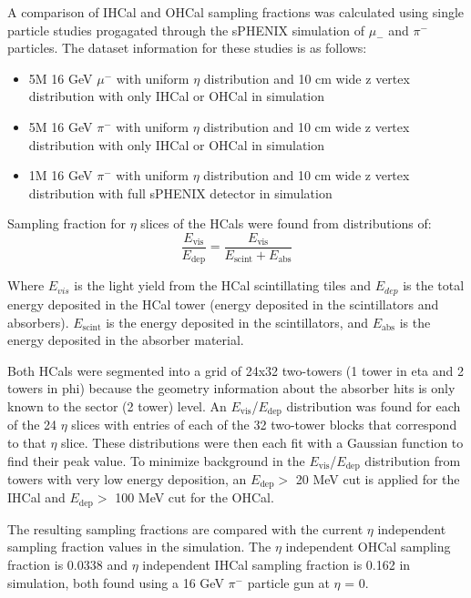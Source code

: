 A comparison of IHCal and OHCal sampling fractions was calculated using single particle studies progagated through the sPHENIX \geant simulation of $\mu_{-}$ and $\pi^{-}$ particles. 
The dataset information for these studies is as follows: 
\begin{itemize}
    \item 5M 16 GeV $\mu^{-}$ with uniform $\eta$ distribution and 10 cm wide z vertex distribution with only IHCal or OHCal in simulation
    \item 5M 16 GeV $\pi^{-}$ with uniform $\eta$ distribution and 10 cm wide z vertex distribution with only IHCal or OHCal in simulation
    \item 1M 16 GeV $\pi^{-}$ with uniform $\eta$ distribution and 10 cm wide z vertex distribution with full sPHENIX detector in simulation
\end{itemize}

Sampling fraction for $\eta$ slices of the HCals were found from distributions of:
\begin{equation}
    \frac{E_{\text{vis}}}{E_{\text{dep}}} = \frac{E_{\text{vis}}}{E_{\text{scint}} + E_{\text{abs}}}
\end{equation}

Where $E_{vis}$ is the light yield from the HCal scintillating tiles and $E_{dep}$ is the total energy deposited in the HCal tower (energy deposited in the scintillators and absorbers). 
$E_{\text{scint}}$ is the energy deposited in the scintillators, and $E_{\text{abs}}$ is the energy deposited in the absorber material.

Both HCals were segmented into a grid of 24x32 two-towers (1 tower in eta and 2 towers in phi) because the geometry information about the absorber hits is only known to the sector (2 tower) level. 
An $E_{\text{vis}}$/$E_{\text{dep}}$ distribution was found for each of the 24 $\eta$ slices with entries of each of the 32 two-tower blocks that correspond to that $\eta$ slice. 
These distributions were then each fit with a Gaussian function to find their peak value.
To minimize background in the $E_{\text{vis}}$/$E_{\text{dep}}$ distribution from towers with very low energy deposition, an $E_{\text{dep}} >$ 20 MeV cut is applied for the IHCal and $E_{\text{dep}} >$ 100 MeV cut for the OHCal.

The resulting sampling fractions are compared with the current $\eta$ independent sampling fraction values in the simulation. 
The $\eta$ independent OHCal sampling fraction is 0.0338 and $\eta$ independent IHCal sampling fraction is 0.162 in simulation, both found using a 16 GeV $\pi^{-}$ particle gun at $\eta$ = 0.

